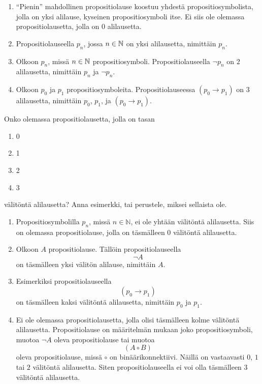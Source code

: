\documentclass[11pt,a4paper]{amsart}
\begin{document}
\begin{solution}
\leavevmode\par
\begin{enumerate}[label=\alph*), nosep]
\item ``Pienin'' mahdollinen propositiolause koostuu yhdestä
propositiosymbolista, jolla on yksi alilause, kyseinen propositiosymboli
itse. Ei siis ole olemassa propositiolausetta, jolla on \(0\) alilausetta.
\item Propositiolauseella \(p_n\), jossa \(n \in \mathbb{N}\) on yksi alilausetta,
nimittäin \(p_n\).
\item Olkoon \(p_n\), missä \(n \in \mathbb{N}\) propositiosymboli. Propositiolauseella
\(\neg p_n\) on \(2\) alilausetta, nimittäin \(p_n\) ja \(\neg p_n\).
\item Olkoon \(p_0\) ja \(p_1\) propositiosymboleita. Propositiolauseessa
\((p_0 \rightarrow p_1)\) on \(3\) alilausetta, nimittäin
\(p_0\), \(p_1\), ja \((p_0 \rightarrow p_1)\).
\end{enumerate}
\end{solution}

\begin{exercise}
Onko olemassa propositiolausetta, jolla on tasan
\begin{enumerate}[label=\alph*), nosep]
\item 0
\item 1
\item 2
\item 3
\end{enumerate}
välitöntä alilausetta? Anna esimerkki, tai perustele, miksei sellaista ole.
\end{exercise}

\begin{solution}
\leavevmode\par
\begin{enumerate}[label=\alph*), nosep]
\item Propositiosymbolilla \(p_n\), missä \(n \in \mathbb{N}\), ei ole
yhtään välitöntä alilausetta. Siis on olemassa propositiolause, jolla on
täsmälleen \(0\) välitöntä alilausetta.

\item Olkoon \(A\) propositiolause. Tällöin propositiolauseella
\[
\neg A
\]
on täsmälleen yksi välitön alilause, nimittäin \(A\).

\item Esimerkiksi propositiolauseella
\[
(p_0 \to p_1)
\]
on täsmälleen kaksi välitöntä alilausetta, nimittäin \(p_0\) ja \(p_1\).

\item Ei ole olemassa propositiolausetta, jolla olisi täsmälleen kolme
välitöntä alilausetta. Propositiolause on määritelmän mukaan joko
propositiosymboli, muotoa \(\neg A\) oleva propositiolause tai muotoa
\[
(A \mathbin{\circ} B)
\]
oleva propositiolause, missä \(\circ\) on binäärikonnektiivi. Näillä on
vastaavasti \(0\), \(1\) tai \(2\) välitöntä alilausetta. Siten
propositiolauseella ei voi olla täsmälleen \(3\) välitöntä alilausetta.
\end{enumerate}
\end{solution}
\end{document}
